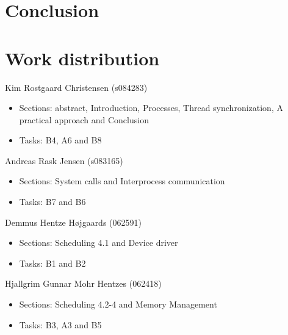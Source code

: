 \documentclass{acm_proc_article-sp}
\begin{document}
\section{Conclusion}
\label{sec:conclusion}


%



\appendix
\section{Work distribution}
Kim Rostgaard Christensen (s084283) 
\begin{itemize}
\item Sections: abstract, Introduction, Processes, Thread synchronization, A practical approach and Conclusion
\item Tasks: B4, A6 and B8
\end{itemize}

Andreas Rask Jensen (s083165)
\begin{itemize}
\item Sections: System calls and Interprocess communication
\item Tasks: B7 and B6
\end{itemize}

Demmus Hentze Højgaards (062591)
\begin{itemize}
\item Sections: Scheduling 4.1 and Device driver
\item Tasks: B1 and B2
\end{itemize}

Hjallgrim Gunnar Mohr Hentzes (062418)
\begin{itemize}
\item Sections: Scheduling 4.2-4 and Memory Management
\item Tasks: B3, A3 and B5
\end{itemize}





\nocite{*}
%
%


\end{document}
